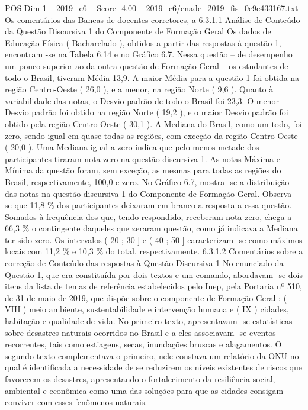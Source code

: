 \begin{textsample}{POS Dim 1 – 2019\_c6 – Score -4.00 – 2019\_c6/enade\_2019\_fis\_0e9c433167.txt}
Os comentários das Bancas de docentes corretores, a 6.3.1.1 Análise de Conteúdo da Questão Discursiva 1 do Componente de Formação Geral Os dados de Educação Física ( Bacharelado ), obtidos a partir das respostas à questão 1, encontram -se na Tabela 6.14 e no Gráfico 6.7.
Nessa questão – de desempenho um pouco superior ao da outra questão de Formação Geral – os estudantes de todo o Brasil, tiveram Média 13,9.
A maior Média para a questão 1 foi obtida na região Centro-Oeste ( 26,0 ), e a menor, na região Norte ( 9,6 ).
Quanto à variabilidade das notas, o Desvio padrão de todo o Brasil foi 23,3.
O menor Desvio padrão foi obtido na região Norte ( 19,2 ), e o maior Desvio padrão foi obtido pela região Centro-Oeste ( 30,1 ).
A Mediana do Brasil, como um todo, foi zero, sendo igual em quase todas as regiões, com exceção da região Centro-Oeste ( 20,0 ).
Uma Mediana igual a zero indica que pelo menos metade dos participantes tiraram nota zero na questão discursiva 1.
As notas Máxima e Mínima da questão foram, sem exceção, as mesmas para todas as regiões do Brasil, respectivamente, 100,0 e zero.
No Gráfico 6.7, mostra -se a distribuição das notas na questão discursiva 1 do Componente de Formação Geral.
Observa -se que 11,8 \% dos participantes deixaram em branco a resposta a essa questão.
Somados à frequência dos que, tendo respondido, receberam nota zero, chega a 66,3 \% o contingente daqueles que zeraram questão, como já indicava a Mediana ter sido zero.
Os intervalos ( 20 ; 30 ] e ( 40 ; 50 ] caracterizam -se como máximos locais com 11,2 \% e 10,3 \% do total, respectivamente. 6.3.1.2 Comentários sobre a correção de Conteúdo das respostas à Questão Discursiva 1 No enunciado da Questão 1, que era constituída por dois textos e um comando, abordavam -se dois itens da lista de temas de referência estabelecidos pelo Inep, pela Portaria nº 510, de 31 de maio de 2019, que dispõe sobre o componente de Formação Geral : ( VIII ) meio ambiente, sustentabilidade e intervenção humana e ( IX ) cidades, habitação e qualidade de vida.
No primeiro texto, apresentavam -se estatísticas sobre desastres naturais ocorridos no Brasil e a eles associavam -se eventos recorrentes, tais como estiagens, secas, inundações bruscas e alagamentos.
O segundo texto complementava o primeiro, nele constava um relatório da ONU no qual é identificada a necessidade de se reduzirem os níveis existentes de riscos que favorecem os desastres, apresentando o fortalecimento da resiliência social, ambiental e econômica como uma das soluções para que as cidades consigam conviver com esses fenômenos naturais.

\end{textsample}
